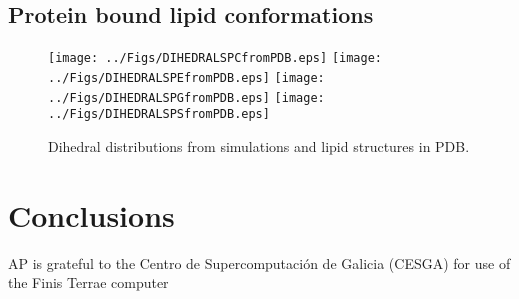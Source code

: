 \documentclass[aps,prl,superscriptaddress,twocolumn]{revtex4}
\begin{document}




\subsection{Protein bound lipid conformations }
\begin{figure*}[!h]
  \centering
  \texttt{[image: ../Figs/DIHEDRALSPCfromPDB.eps]}
  \texttt{[image: ../Figs/DIHEDRALSPEfromPDB.eps]}
  \texttt{[image: ../Figs/DIHEDRALSPGfromPDB.eps]}
  \texttt{[image: ../Figs/DIHEDRALSPSfromPDB.eps]}
  \caption{\label{structures}
    Dihedral distributions from simulations and lipid structures in PDB.
  }
\end{figure*}







\clearpage
\section{Conclusions}


%

\begin{acknowledgments}
AP is grateful to the Centro de
Supercomputación de Galicia (CESGA) for use of the Finis
Terrae computer
\end{acknowledgments}
\end{document}
